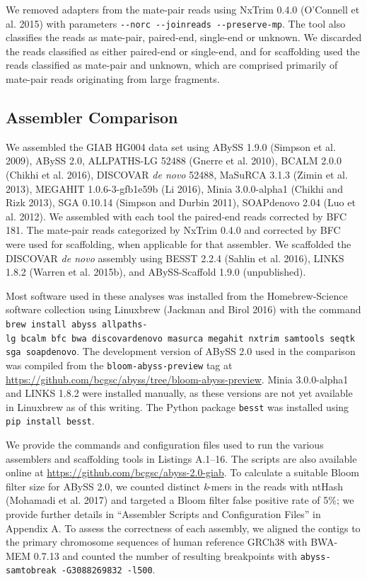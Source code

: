 \documentclass[
  12pt,
  oneside,
  openany]{book}
\begin{document}
We removed adapters from the mate-pair reads using NxTrim 0.4.0 (O'Connell et al. 2015) with parameters \texttt{-\/-norc\ -\/-joinreads\ -\/-preserve-mp}. The tool also classifies the reads as mate-pair, paired-end, single-end or unknown. We discarded the reads classified as either paired-end or single-end, and for scaffolding used the reads classified as mate-pair and unknown, which are comprised primarily of mate-pair reads originating from large fragments.

\hypertarget{assembler-comparison-1}{%
\subsection{Assembler Comparison}\label{assembler-comparison-1}}

We assembled the GIAB HG004 data set using ABySS 1.9.0 (Simpson et al. 2009), ABySS 2.0, ALLPATHS-LG 52488 (Gnerre et al. 2010), BCALM 2.0.0 (Chikhi et al. 2016), DISCOVAR \emph{de novo} 52488, MaSuRCA 3.1.3 (Zimin et al. 2013), MEGAHIT 1.0.6-3-gfb1e59b (Li 2016), Minia 3.0.0-alpha1 (Chikhi and Rizk 2013), SGA 0.10.14 (Simpson and Durbin 2011), SOAPdenovo 2.04 (Luo et al. 2012). We assembled with each tool the paired-end reads corrected by BFC 181. The mate-pair reads categorized by NxTrim 0.4.0 and corrected by BFC were used for scaffolding, when applicable for that assembler. We scaffolded the DISCOVAR \emph{de novo} assembly using BESST 2.2.4 (Sahlin et al. 2016), LINKS 1.8.2 (Warren et al. 2015b), and ABySS-Scaffold 1.9.0 (unpublished).

Most software used in these analyses was installed from the Homebrew-Science software collection using Linuxbrew (Jackman and Birol 2016) with the command \texttt{brew\ install\ abyss\ allpaths-lg\ bcalm\ bfc\ bwa\ discovardenovo\ masurca\ megahit\ nxtrim\ samtools\ seqtk\ sga\ soapdenovo}. The development version of ABySS 2.0 used in the comparison was compiled from the \texttt{bloom-abyss-preview} tag at \url{https://github.com/bcgsc/abyss/tree/bloom-abyss-preview}. Minia 3.0.0-alpha1 and LINKS 1.8.2 were installed manually, as these versions are not yet available in Linuxbrew as of this writing. The Python package \texttt{besst} was installed using \texttt{pip\ install\ besst}.

We provide the commands and configuration files used to run the various assemblers and scaffolding tools in Listings A.1--16. The scripts are also available online at \url{https://github.com/bcgsc/abyss-2.0-giab}. To calculate a suitable Bloom filter size for ABySS 2.0, we counted distinct \emph{k}-mers in the reads with ntHash (Mohamadi et al. 2017) and targeted a Bloom filter false positive rate of 5\%; we provide further details in ``Assembler Scripts and Configuration Files'' in Appendix A. To assess the correctness of each assembly, we aligned the contigs to the primary chromosome sequences of human reference GRCh38 with BWA-MEM 0.7.13 and counted the number of resulting breakpoints with \texttt{abyss-samtobreak\ -G3088269832\ -l500}.
\end{document}
